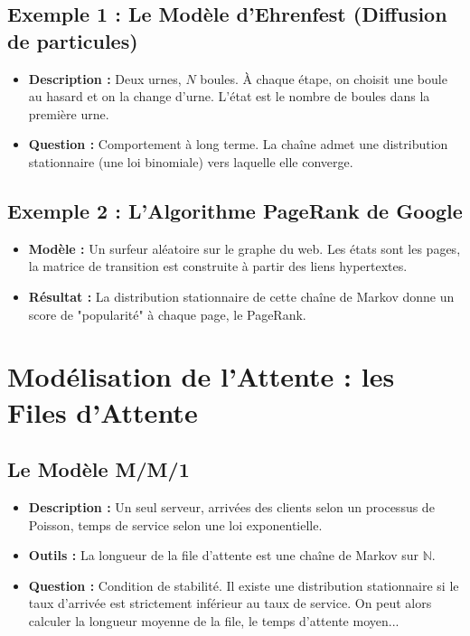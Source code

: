 \documentclass[12pt, a4paper, parskip=full]{report}
\theoremstyle{agregstyle}
\begin{document}
\subsection{Exemple 1 : Le Modèle d'Ehrenfest (Diffusion de particules)}
\begin{itemize}
    \item \textbf{Description :} Deux urnes, $N$ boules. À chaque étape, on choisit une boule au hasard et on la change d'urne. L'état est le nombre de boules dans la première urne.
    \item \textbf{Question :} Comportement à long terme. La chaîne admet une distribution stationnaire (une loi binomiale) vers laquelle elle converge.
\end{itemize}
\subsection{Exemple 2 : L'Algorithme PageRank de Google}
\begin{itemize}
    \item \textbf{Modèle :} Un surfeur aléatoire sur le graphe du web. Les états sont les pages, la matrice de transition est construite à partir des liens hypertextes.
    \item \textbf{Résultat :} La distribution stationnaire de cette chaîne de Markov donne un score de "popularité" à chaque page, le PageRank.
\end{itemize}

\section{Modélisation de l'Attente : les Files d'Attente}
\subsection{Le Modèle M/M/1}
\begin{itemize}
    \item \textbf{Description :} Un seul serveur, arrivées des clients selon un processus de Poisson, temps de service selon une loi exponentielle.
    \item \textbf{Outils :} La longueur de la file d'attente est une chaîne de Markov sur $\mathbb{N}$.
    \item \textbf{Question :} Condition de stabilité. Il existe une distribution stationnaire si le taux d'arrivée est strictement inférieur au taux de service. On peut alors calculer la longueur moyenne de la file, le temps d'attente moyen...
\end{itemize}
\end{document}
